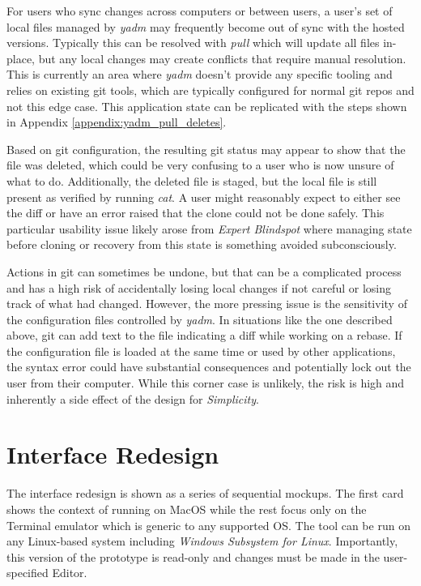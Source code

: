 \documentclass[letterpaper]{jdf}
\begin{document}
 For users who sync changes across computers or between users, a user's set of local files managed by \emph{yadm} may frequently become out of sync with the hosted versions. Typically this can be resolved with \emph{pull} which will update all files in-place, but any local changes may create conflicts that require manual resolution. This is currently an area where \emph{yadm} doesn't provide any specific tooling and relies on existing git tools, which are typically configured for normal git repos and not this edge case. This application state can be replicated with the steps shown in Appendix \ref{appendix:yadm_pull_deletes}.

Based on git configuration, the resulting git status may appear to show that the file was deleted, which could be very confusing to a user who is now unsure of what to do. Additionally, the deleted file is staged, but the local file is still present as verified by running \emph{cat}. A user might reasonably expect to either see the diff or have an error raised that the clone could not be done safely. This particular usability issue likely arose from \emph{Expert Blindspot} where managing state before cloning or recovery from this state is something avoided subconsciously.

 Actions in git can sometimes be undone, but that can be a complicated process and has a high risk of  accidentally losing local changes if not careful or losing track of what had changed. However, the more pressing issue is the sensitivity of the configuration files controlled by \emph{yadm}. In situations like the one described above, git can add text to the file indicating a diff while working on a rebase. If the configuration file is loaded at the same time or used by other applications, the syntax error could have substantial consequences and potentially lock out the user from their computer. While this corner case is unlikely, the risk is high and inherently a side effect of the design for \emph{Simplicity}.

\section{Interface Redesign}
The interface redesign is shown as a series of sequential mockups. The first card shows the context of running on MacOS while the rest focus only on the Terminal emulator which is generic to any supported OS. The tool can be run on any Linux-based system including \emph{Windows Subsystem for Linux}. Importantly, this version of the prototype is read-only and changes must be made in the user-specified Editor.
\end{document}
